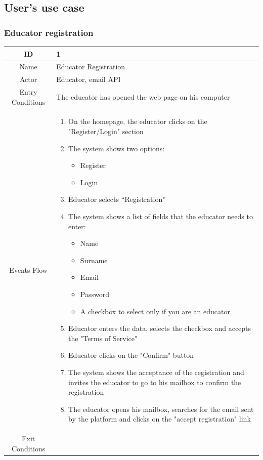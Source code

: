 \subsection{User's use case}
\subsubsection{Educator registration}
\begin{longtable}{|c| p{10cm}|}
\hline
ID & 1 \\
\hline
Name & Educator Registration \\
\hline
Actor & Educator, email API \\
\hline
Entry Conditions &
The educator has opened the web page on his computer\\
\hline
Events Flow & \begin{enumerate}
\item On the homepage, the educator clicks on the "Register/Login" section
\item The system shows two options:
\begin{itemize}
\item Register
\item Login
\end{itemize}
\item Educator selects “Registration”
\item The system shows a list of fields that the educator needs to enter:
\begin{itemize}
\item Name
\item Surname
\item Email
\item Password
\item A checkbox to select only if you are an educator
\end{itemize}
\item Educator enters the data, selects the checkbox and accepts the "Terms of Service"
\item Educator clicks on the "Confirm" button
\item The system shows the acceptance of the registration and invites the educator to go to his mailbox to confirm the registration
\item The educator opens his mailbox, searches for the email sent by the platform and clicks on the "accept registration" link
\end{enumerate} \\
\hline
Exit Conditions &
\begin{itemize}

\end{itemize}
\end{longtable}
